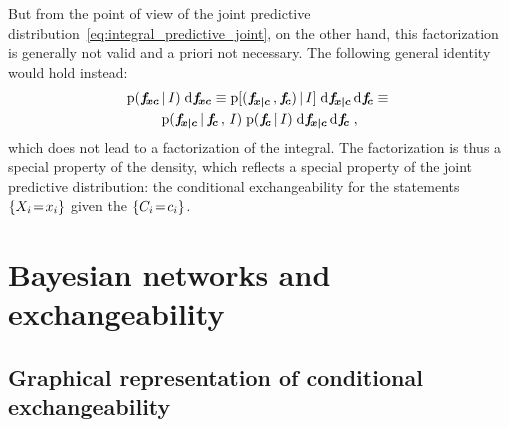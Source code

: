 \documentclass[\ifafour a4paper,12pt,\else a5paper,10pt,\fi%
onecolumn,oneside,article,%
british%
]{memoir}
\theoremstyle{remark}
\theoremstyle{innote}
\newcommand*{\di}{\mathrm{d}}%
\DeclarePairedDelimiter\set{\{}{\}}
\newcommand*{\pf}{\mathrm{p}}%
\renewcommand*{\|}[1][]{\nonscript\,#1\vert\nonscript\,\mathopen{}}
\renewcommand*{\=}{\TextOrMath\texteq\eq}
\newcommand*{\X}[1]{X_{#1}}
\newcommand*{\x}[1]{x_{#1}}
\newcommand*{\C}[1]{C_{#1}}
\newcommand*{\cc}[1]{c_{#1}}
\newcommand*{\fxc}{\bm{f_{\!x\bcond c}}}
\newcommand*{\fc}{\bm{f_{\!c}}}
\newcommand*{\fj}{\bm{f_{\!xc}}}
\newcommand*{\bcond}[1][]{\nonscript\,#1\bm{\vert}\nonscript\;\mathopen{}}
\begin{document}
But from the point of view of the joint predictive
distribution~\eqref{eq:integral_predictive_joint}, on the other hand, this
factorization is generally not valid and a priori not necessary. The
following general identity would hold instead:
\begin{multline}
  \label{eq:identities_factor}
  \pf(\fj\|I)\;\di\fj \equiv
  \pf[(\fxc \,,\fc) \| I] \;\di\fxc\,\di\fc
  \equiv{}\\
  \pf(\fxc \| \fc\,,\, I)  \;
  \pf(\fc \| I) \;\di\fxc\,\di\fc \;,
\end{multline}
which does not lead to a factorization of the integral.
The factorization is thus a special property of the density, which reflects
a special property of the joint predictive distribution: the conditional
exchangeability for the statements $\set{\X{i}\=\x{i}}$ given the
$\set{\C{i}\=\cc{i}}$.


\section{Bayesian networks and exchangeability}
\label{sec:exch_nets}

\subsection{Graphical representation of conditional exchangeability}
\label{sec:graph_repr}
\end{document}
